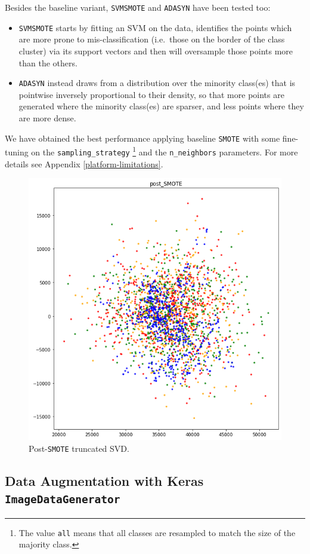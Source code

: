 \documentclass[aps,twocolumn,secnumarabic,nobalancelastpage,amsmath,amssymb,
nofootinbib]{revtex4}
\begin{document}
Besides the baseline variant, \texttt{SVMSMOTE} and \texttt{ADASYN} have
been tested too:

\begin{itemize}
\item
\texttt{SVMSMOTE} starts by fitting an SVM on the data, identifies the
points which are more prone to mis-classification (i.e.~those on the
border of the class cluster) via its support vectors and then will
oversample those points more than the others.
\vspace{-0.2cm}\item
\texttt{ADASYN} instead draws from a distribution over the minority
class(es) that is pointwise inversely proportional to their density,
so that more points are generated where the minority class(es) are
sparser, and less points where they are more dense.
\end{itemize}

We have obtained the best performance applying baseline \texttt{SMOTE}
with some fine-tuning on the \texttt{sampling\_strategy} \footnote{The
value \texttt{all} means that all classes are resampled to match the
size of the majority class.} and the \texttt{n\_neighbors} parameters.
For more details see Appendix \ref{platform-limitations}.

\begin{figure}[h]
	\centering
	\includegraphics[width=0.7\linewidth]{Images/TruncatedSVD_postSMOTE}
	\caption{Post-\texttt{SMOTE} truncated SVD.}\label{fig:post-smote}
\end{figure}

\subsection{Data Augmentation with Keras
		\texttt{ImageDataGenerator}\label{data-generator}}
\end{document}
